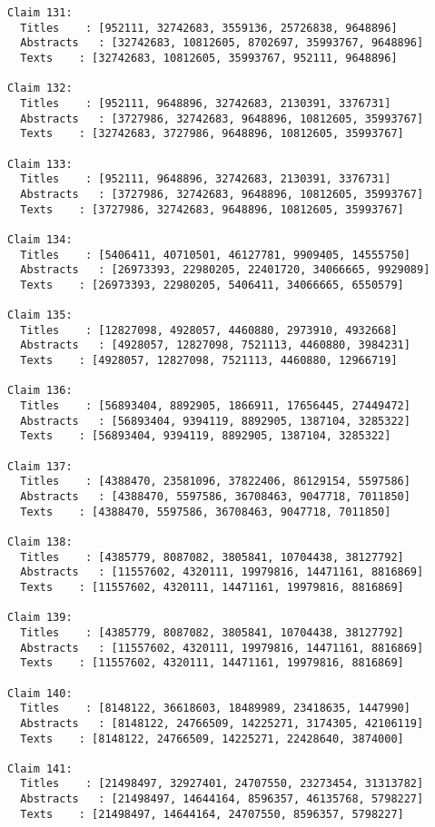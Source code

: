 \documentclass[11pt]{article}
\begin{document}
\begin{Verbatim}[commandchars=\\\{\}]
Claim 131:
  Titles    : [952111, 32742683, 3559136, 25726838, 9648896]
  Abstracts   : [32742683, 10812605, 8702697, 35993767, 9648896]
  Texts    : [32742683, 10812605, 35993767, 952111, 9648896]

Claim 132:
  Titles    : [952111, 9648896, 32742683, 2130391, 3376731]
  Abstracts   : [3727986, 32742683, 9648896, 10812605, 35993767]
  Texts    : [32742683, 3727986, 9648896, 10812605, 35993767]

Claim 133:
  Titles    : [952111, 9648896, 32742683, 2130391, 3376731]
  Abstracts   : [3727986, 32742683, 9648896, 10812605, 35993767]
  Texts    : [3727986, 32742683, 9648896, 10812605, 35993767]

Claim 134:
  Titles    : [5406411, 40710501, 46127781, 9909405, 14555750]
  Abstracts   : [26973393, 22980205, 22401720, 34066665, 9929089]
  Texts    : [26973393, 22980205, 5406411, 34066665, 6550579]

Claim 135:
  Titles    : [12827098, 4928057, 4460880, 2973910, 4932668]
  Abstracts   : [4928057, 12827098, 7521113, 4460880, 3984231]
  Texts    : [4928057, 12827098, 7521113, 4460880, 12966719]

Claim 136:
  Titles    : [56893404, 8892905, 1866911, 17656445, 27449472]
  Abstracts   : [56893404, 9394119, 8892905, 1387104, 3285322]
  Texts    : [56893404, 9394119, 8892905, 1387104, 3285322]

Claim 137:
  Titles    : [4388470, 23581096, 37822406, 86129154, 5597586]
  Abstracts   : [4388470, 5597586, 36708463, 9047718, 7011850]
  Texts    : [4388470, 5597586, 36708463, 9047718, 7011850]

Claim 138:
  Titles    : [4385779, 8087082, 3805841, 10704438, 38127792]
  Abstracts   : [11557602, 4320111, 19979816, 14471161, 8816869]
  Texts    : [11557602, 4320111, 14471161, 19979816, 8816869]

Claim 139:
  Titles    : [4385779, 8087082, 3805841, 10704438, 38127792]
  Abstracts   : [11557602, 4320111, 19979816, 14471161, 8816869]
  Texts    : [11557602, 4320111, 14471161, 19979816, 8816869]

Claim 140:
  Titles    : [8148122, 36618603, 18489989, 23418635, 1447990]
  Abstracts   : [8148122, 24766509, 14225271, 3174305, 42106119]
  Texts    : [8148122, 24766509, 14225271, 22428640, 3874000]

Claim 141:
  Titles    : [21498497, 32927401, 24707550, 23273454, 31313782]
  Abstracts   : [21498497, 14644164, 8596357, 46135768, 5798227]
  Texts    : [21498497, 14644164, 24707550, 8596357, 5798227]


\end{Verbatim}
\end{document}
